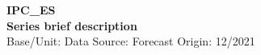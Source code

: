 \documentclass[a4paper,10pt]{article}
\begin{document}
\thispagestyle{empty}
\begin{landscape}
\begin{center}

\textbf{IPC_ES} \\ 

\textbf{Series brief description} \\ 

Base/Unit: 
\space \space \space Data Source:  
\space \space \space Forecast Origin: 12/2021 \\ 
\end{center}

\begin{footnotesize} \singlespacing  \end{footnotesize} 

\end{landscape}
\end{document}
